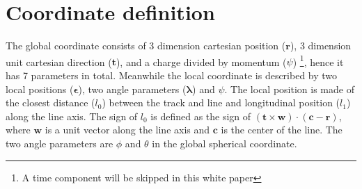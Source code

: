 \documentclass[12pt,a4paper]{scrarticle}
\begin{document}
\maketitle

\begin{abstract}
    
\end{abstract}

\newcommand{\jacobianLocalToGlobal}{\mathbb{J}_{L \rightarrow G}}
\newcommand{\jacobianGlobalToLocal}{\mathbb{J}_{G \rightarrow L}}

\newcommand{\globalPosition}{\mathbf{r}}
\newcommand{\globalDirection}{\mathbf{t}}
\newcommand{\qoverp}{\psi}

\newcommand{\localPosition}{\boldsymbol{\epsilon}}
\newcommand{\localAngle}{\boldsymbol{\lambda}}
\newcommand{\surfaceCenter}{\mathbf{c}}
\newcommand{\surfaceNormal}{\mathbf{w}}
\newcommand{\ubasis}{\mathbf{u}}
\newcommand{\vbasis}{\mathbf{v}}
\newcommand{\localPosU}{l_0}
\newcommand{\localPosV}{l_1}

\newcommand{\zeroMatrix}{\mathbb{O}}

\tableofcontents

\section{Coordinate definition}
 The global coordinate consists of 3 dimension cartesian position ($\globalPosition$), 3 dimension unit cartesian direction ($\globalDirection$), and a charge divided by momentum ($\qoverp$) \footnote{A time component will be skipped in this white paper}, hence it has 7 parameters in total. Meanwhile the local coordinate is described by two local positions ($\localPosition$), two angle parameters ($\localAngle$) and $\qoverp$. The local position is made of the closest distance ($l_0$) between the track and line and longitudinal position ($l_1$) along the line axis. The sign of $l_0$ is defined as the sign of $ (\globalDirection \times \surfaceNormal) \cdot (\surfaceCenter - \globalPosition)$, where $\surfaceNormal$ is a unit vector along the line axis and $\surfaceCenter$ is the center of the line. The two angle parameters are $\phi$ and $\theta$ in the global spherical coordinate.
\end{document}
